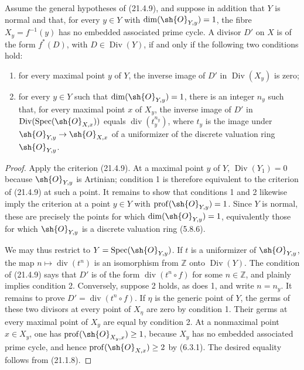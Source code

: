 \begin{corollary}[21.4.10]
\ifdefined\EGAIVSuppressErratumLabels\else\label{IV.21.4.10}\fi
Assume the general hypotheses of (21.4.9), and suppose in addition that
$Y$ is normal and that, for every $y\in Y$ with
$\dim(\sh{O}_{Y,y})=1$, the fibre $X_y=f^{-1}(y)$ has no embedded
associated prime cycle.  A divisor $D'$ on $X$ is of the form $f^*(D)$,
with $D\in\operatorname{Div}(Y)$, if and only if the following two
conditions hold:
\begin{enumerate}[label=\textup{\arabic*\textdegree}]
\item for every maximal point $y$ of $Y$, the inverse image of $D'$ in
$\operatorname{Div}(X_y)$ is zero;
\item for every $y\in Y$ such that $\dim(\sh{O}_{Y,y})=1$, there is an
integer $n_y$ such that, for every maximal point $x$ of $X_y$, the
inverse image of $D'$ in
$\operatorname{Div}(\operatorname{Spec}(\sh{O}_{X,x}))$ equals
$\operatorname{div}(t_y^{n_y})$, where $t_y$ is the image under
$\sh{O}_{Y,y}\to\sh{O}_{X,x}$ of a uniformizer of the discrete
valuation ring $\sh{O}_{Y,y}$.
\end{enumerate}
\end{corollary}

\begin{proof}
Apply the criterion (21.4.9).  At a maximal point $y$ of $Y$,
$\operatorname{Div}(Y_1)=0$ because $\sh{O}_{Y,y}$ is Artinian;
condition 1\textdegree{} is therefore equivalent to the criterion of
(21.4.9) at such a point.  It remains to show that conditions
1\textdegree{} and 2\textdegree{} likewise imply the criterion at a
point $y\in Y$ with $\operatorname{prof}(\sh{O}_{Y,y})=1$.  Since $Y$
is normal, these are precisely the points for which
$\dim(\sh{O}_{Y,y})=1$, equivalently those for which
$\sh{O}_{Y,y}$ is a discrete valuation ring (5.8.6).

We may thus restrict to $Y=\operatorname{Spec}(\sh{O}_{Y,y})$.  If $t$
is a uniformizer of $\sh{O}_{Y,y}$, the map
$n\mapsto\operatorname{div}(t^n)$ is an isomorphism from $\mathbb Z$
onto $\operatorname{Div}(Y)$.  The condition of (21.4.9) says that
$D'$ is of the form $\operatorname{div}(t^n\circ f)$ for some
$n\in\mathbb Z$, and plainly implies condition 2\textdegree{}.
Conversely, suppose 2\textdegree{} holds, as does 1\textdegree{}, and
write $n=n_y$.  It remains to prove
$D'=\operatorname{div}(t^n\circ f)$.  If $\eta$ is the generic point of
$Y$, the germs of these two divisors at every point of $X_\eta$ are
zero by condition 1\textdegree{}.  Their germs at every maximal point
of $X_y$ are equal by condition 2\textdegree{}.  At a nonmaximal point
$x\in X_y$, one has
$\operatorname{prof}(\sh{O}_{X_y,x})\geq 1$, because $X_y$ has no
embedded associated prime cycle, and hence
$\operatorname{prof}(\sh{O}_{X,x})\geq 2$ by (6.3.1).  The desired
equality follows from (21.1.8).
\end{proof}

